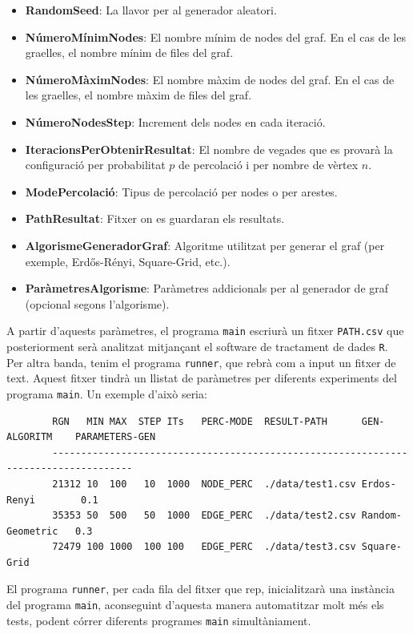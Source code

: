 \documentclass[a4paper]{article}
\begin{document}
	\begin{itemize}
		\item \textbf{RandomSeed}: La llavor per al generador aleatori.
		\item \textbf{NúmeroMínimNodes}: El nombre mínim de nodes del graf. En el cas de les graelles, el nombre mínim de files del graf.
		\item \textbf{NúmeroMàximNodes}: El nombre màxim de nodes del graf. En el cas de les graelles, el nombre màxim de files del graf.
		\item \textbf{NúmeroNodesStep}: Increment dels nodes en cada iteració.
		\item \textbf{IteracionsPerObtenirResultat}: El nombre de vegades que es provarà la configuració per probabilitat $p$ de percolació i per nombre de vèrtex $n$.
		\item \textbf{ModePercolació}: Tipus de percolació per nodes o per arestes.
		\item \textbf{PathResultat}: Fitxer on es guardaran els resultats.
		\item \textbf{AlgorismeGeneradorGraf}: Algoritme utilitzat per generar el graf (per exemple, Erdős-Rényi, Square-Grid, etc.).
		\item \textbf{ParàmetresAlgorisme}: Paràmetres addicionals per al generador de graf (opcional segons l'algorisme).
	\end{itemize}
	
	A partir d'aquests paràmetres, el programa \texttt{main} escriurà un fitxer \texttt{PATH.csv} que posteriorment serà analitzat mitjançant el software de tractament de dades \texttt{R}. \\
	
	Per altra banda, tenim el programa \texttt{runner}, que rebrà com a input un fitxer de text. Aquest fitxer tindrà un llistat de paràmetres per diferents experiments del programa \texttt{main}. Un exemple d'això seria:
	
	\begin{verbatim}
		RGN   MIN MAX  STEP ITs   PERC-MODE  RESULT-PATH      GEN-ALGORITM    PARAMETERS-GEN
		------------------------------------------------------------------------------------
		21312 10  100   10  1000  NODE_PERC  ./data/test1.csv Erdos-Renyi        0.1
		35353 50  500   50  1000  EDGE_PERC  ./data/test2.csv Random-Geometric   0.3
		72479 100 1000  100 100   EDGE_PERC  ./data/test3.csv Square-Grid
	\end{verbatim}
	
	El programa \texttt{runner}, per cada fila del fitxer que rep, inicialitzarà una instància del programa \texttt{main}, aconseguint d'aquesta manera automatitzar molt més els tests, podent córrer diferents programes \texttt{main} simultàniament. \\
	
\end{document}
